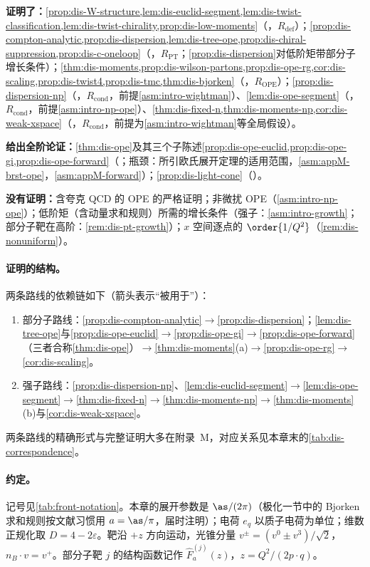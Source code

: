 \begin{tcolorbox}[enhanced,breakable,title=本章证明了什么／没有证明什么,fonttitle=\bfseries,
  colback=gray!3!white,colframe=gray!55!black,boxrule=0.6pt,arc=2pt,
  left=5pt,right=5pt,top=3pt,bottom=3pt,before skip=6pt,after skip=6pt]
\textbf{证明了：}\cref{prop:dis-W-structure,lem:dis-euclid-segment,lem:dis-twist-classification,lem:dis-twist-chirality,prop:dis-low-moments}（\tagR，$R_{\mathrm{def}}$）；\cref{prop:dis-compton-analytic,prop:dis-dispersion,lem:dis-tree-ope,prop:dis-chiral-suppression,prop:dis-c-oneloop}（\tagR，$R_{\mathrm{PT}}$；\cref{prop:dis-dispersion}对低阶矩带部分子增长条件）；\cref{thm:dis-moments,prop:dis-wilson-partons,prop:dis-ope-rg,cor:dis-scaling,prop:dis-twist4,prop:dis-tmc,thm:dis-bjorken}（\tagR，$R_{\mathrm{OPE}}$）；\cref{prop:dis-dispersion-np}（\tagR，$R_{\mathrm{cond}}$，前提\cref{asm:intro-wightman}）、\cref{lem:dis-ope-segment}（\tagR，$R_{\mathrm{cond}}$，前提\cref{asm:intro-np-ope}）、\cref{thm:dis-fixed-n,thm:dis-moments-np,cor:dis-weak-xspace}（\tagR，$R_{\mathrm{cond}}$，前提为\cref{asm:intro-wightman}等全局假设）。\par
\textbf{给出全阶论证：}\cref{thm:dis-ope}及其三个子陈述\cref{prop:dis-ope-euclid,prop:dis-ope-gi,prop:dis-ope-forward}（\tagA；瓶颈：所引欧氏展开定理的适用范围，\cref{asm:appM-brst-ope}，\cref{asm:appM-forward}）；\cref{prop:dis-light-cone}（\tagA）。\par
\textbf{没有证明：}含夸克 QCD 的 OPE 的严格证明；非微扰 OPE（\cref{asm:intro-np-ope}）；低阶矩（含动量求和规则）所需的增长条件（强子：\cref{asm:intro-growth}；部分子靶在高阶：\cref{rem:dis-pt-growth}）；$x$ 空间逐点的 $\order{1/Q^2}$（\cref{rem:dis-nonuniform}）。
\end{tcolorbox}

\paragraph{证明的结构。}两条路线的依赖链如下（箭头表示“被用于”）：
\begin{enumerate}[label=(\roman*),leftmargin=2.2em,itemsep=1pt,topsep=2pt]
\item 部分子路线：\cref{prop:dis-compton-analytic}$\to$\cref{prop:dis-dispersion}；\cref{lem:dis-tree-ope}与\cref{prop:dis-ope-euclid}$\to$\cref{prop:dis-ope-gi}$\to$\cref{prop:dis-ope-forward}（三者合称\cref{thm:dis-ope}）$\to$\cref{thm:dis-moments}(a)$\to$\cref{prop:dis-ope-rg}$\to$\cref{cor:dis-scaling}。
\item 强子路线：\cref{prop:dis-dispersion-np}、\cref{lem:dis-euclid-segment}$\to$\cref{lem:dis-ope-segment}$\to$\cref{thm:dis-fixed-n}$\to$\cref{thm:dis-moments-np}$\to$\cref{thm:dis-moments}(b)与\cref{cor:dis-weak-xspace}。
\end{enumerate}
两条路线的精确形式与完整证明大多在附录~M，对应关系见本章末的\cref{tab:dis-correspondence}。

\paragraph{约定。}记号见\cref{tab:front-notation}。本章的展开参数是 $\as/(2\pi)$（极化一节中的 Bjorken 求和规则按文献习惯用 $a=\as/\pi$，届时注明）；电荷 $e_q$ 以质子电荷为单位；维数正规化取 $D=4-2\varepsilon$。靶沿 $+z$ 方向运动，光锥分量 $v^\pm=(v^0\pm v^3)/\sqrt2$，$n_B\cdot v=v^+$。部分子靶 $j$ 的结构函数记作 $\hat F^{(j)}_a(z)$，$z=Q^2/(2p\cdot q)$。
